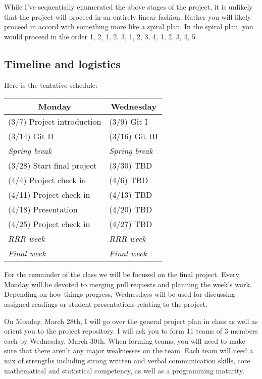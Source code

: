 \documentclass[11pt, oneside]{article}   	%
\begin{document}
While I've sequentially enumerated the above stages of the project, it is
unlikely that the project will proceed in an entirely linear fashion.  Rather
you will likely proceed in accord with something more like a spiral plan.  In
the spiral plan, you would proceed in the order 1, 2, 1, 2, 3, 1, 2, 3, 4, 1,
2, 3, 4, 5.

\subsection*{Timeline and logistics}

Here is the tentative schedule:

\begin{table}[h]
\centering
\begin{tabular}{@{}l|l@{}}
\toprule
\multicolumn{1}{c|}{Monday} & \multicolumn{1}{c}{Wednesday} \\
\hline
(3/7) Project introduction     & (3/9) Git I \\
(3/14) Git II                  & (3/16) Git III \\
\emph{\hspace{12mm} Spring break}  & \emph{\hspace{12mm} Spring break}\\
(3/28) Start final project     & (3/30) TBD\\
(4/4) Project check in         & (4/6) TBD\\
(4/11) Project check in        & (4/13) TBD\\
(4/18) Presentation            & (4/20) TBD\\
(4/25) Project check in        & (4/27) TBD\\
\emph{\hspace{12mm} RRR week}  & \emph{\hspace{12mm} RRR week}\\
\emph{\hspace{12mm} Final week}  & \emph{\hspace{12mm} Final week}\\
\bottomrule
\end{tabular}
\end{table}

For the remainder of the class we will be focused on the final project.  Every
Monday will be devoted to merging pull requests and planning the week's work.
Depending on how things progress, Wednesdays will be used for discussing
assigned readings or student presentations relating to the project.

On Monday, March 28th, I will go over the general project plan in class as well
as orient you to the project repository.  I will ask you to form 11 teams of 3
members each by Wednesday, March 30th.  When forming teams, you will need to
make sure that there aren't any major weaknesses on the team.  Each team will
need a mix of strengths including strong written and verbal communication
skills, core mathematical and statistical competency, as well as a programming
maturity.
\end{document}
